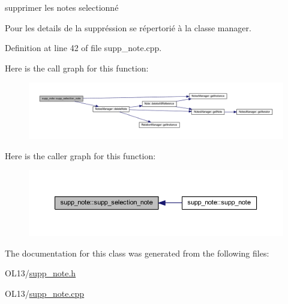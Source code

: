 supprimer les notes selectionné 

Pour les details de la suppréssion se répertorié à la classe manager. 

Definition at line 42 of file supp\+\_\+note.\+cpp.

Here is the call graph for this function\+:\nopagebreak
\begin{figure}[H]
\begin{center}
\leavevmode
\includegraphics[width=350pt]{classsupp__note_a5dbf6d3af5c94d71f42eeb2cf626c9d3_cgraph}
\end{center}
\end{figure}
Here is the caller graph for this function\+:\nopagebreak
\begin{figure}[H]
\begin{center}
\leavevmode
\includegraphics[width=350pt]{classsupp__note_a5dbf6d3af5c94d71f42eeb2cf626c9d3_icgraph}
\end{center}
\end{figure}


The documentation for this class was generated from the following files\+:\begin{DoxyCompactItemize}
\item 
O\+L13/\hyperlink{supp__note_8h}{supp\+\_\+note.\+h}\item 
O\+L13/\hyperlink{supp__note_8cpp}{supp\+\_\+note.\+cpp}\end{DoxyCompactItemize}
